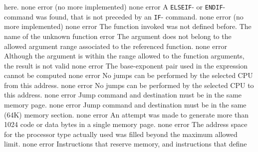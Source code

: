 \documentclass[12pt,twoside]{report}
\newcommand{\tty}[1]{{\tt #1}}
\begin{document}
\begin{description}
{                here.}
               {none}
               {error}
               {(no more implemented)}
               {none}
               {error}
               {A \tty{ELSEIF}- or \tty{ENDIF}- command was found, that is not preceded
                by an \tty{IF}- command.}
               {none}
               {error}
               {(no more implemented)}
               {none}
               {error}
               {The function invoked was not defined before.}
               {The name of the unknown function}
               {error}
               {The argument does not belong to the allowed argument range
                associated to the referenced function.}
               {none}
               {error}
               {Although the argument is within the range allowed to the
                function arguments, the result is not valid}
               {none}
               {error}
               {The base-exponent pair used in the expression cannot be
                computed}
               {none}
               {error}
               {No jumps can be performed by the selected CPU from this
                address.}
               {none}
               {error}
               {No jumps can be performed by the selected CPU to this
                address.}
               {none}
               {error}
               {Jump command and destination must be in the same memory
                page.}
               {none}
               {error}
               {Jump command and destination must be in the same (64K)
                memory section.}
               {none}
               {error}
               {An attempt was made to generate more than 1024 code or
                data bytes in a single memory page.}
               {none}
               {error}
               {The address space for the processor type actually used was
                filled beyond the maximum allowed limit.}
               {none}
               {error}
               {Instructions that reserve memory, and instructions that define
}
\end{description}
\end{document}
